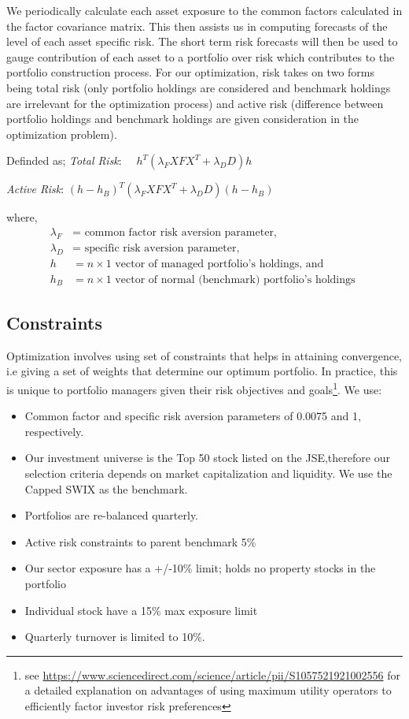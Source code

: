 \documentclass[12pt,preprint, authoryear]{elsarticle}
\numberwithin{equation}{section}
\numberwithin{figure}{section}
\numberwithin{table}{section}
\def\tightlist{} %
\let\rmarkdownfootnote\footnote%
\def\footnote{\protect\rmarkdownfootnote}
\begin{document}
We periodically calculate each asset exposure to the common factors
calculated in the factor covariance matrix. This then assists us in
computing forecasts of the level of each asset specific risk. The short
term risk forecasts will then be used to gauge contribution of each
asset to a portfolio over risk which contributes to the portfolio
construction process. For our optimization, risk takes on two forms
being total risk (only portfolio holdings are considered and benchmark
holdings are irrelevant for the optimization process) and active risk
(difference between portfolio holdings and benchmark holdings are given
consideration in the optimization problem).

Definded as; \emph{Total Risk}:
\(\quad h^T\left(\lambda_F X F X^T+\lambda_D D\right) h\)

\emph{Active Risk}:
\(\left(h-h_B\right)^T\left(\lambda_F X F X^T+\lambda_D D\right)\left(h-h_B\right)\)

where, \[
\begin{aligned}
\lambda_F & =\text { common factor risk aversion parameter, } \\
\lambda_D & =\text { specific risk aversion parameter, } \\
h & =n \times 1 \text { vector of managed portfolio's holdings, and } \\
h_B & =n \times 1 \text { vector of normal (benchmark) portfolio's holdings }
\end{aligned}
\]

\hypertarget{constraints}{%
\subsection{Constraints}\label{constraints}}

Optimization involves using set of constraints that helps in attaining
convergence, i.e giving a set of weights that determine our optimum
portfolio. In practice, this is unique to portfolio managers given their
risk objectives and goals\footnote{see
  \url{https://www.sciencedirect.com/science/article/pii/S1057521921002556}
  for a detailed explanation on advantages of using maximum utility
  operators to efficiently factor investor risk preferences}. We use:

\begin{itemize}
\tightlist
\item
  Common factor and specific risk aversion parameters of 0.0075 and 1,
  respectively.
\item
  Our investment universe is the Top 50 stock listed on the
  JSE,therefore our selection criteria depends on market capitalization
  and liquidity. We use the Capped SWIX as the benchmark.
\item
  Portfolios are re-balanced quarterly.
\item
  Active risk constraints to parent benchmark 5\%
\item
  Our sector exposure has a +/-10\% limit; holds no property stocks in
  the portfolio
\item
  Individual stock have a 15\% max exposure limit
\item
  Quarterly turnover is limited to 10\%.\\
\end{itemize}
\end{document}

